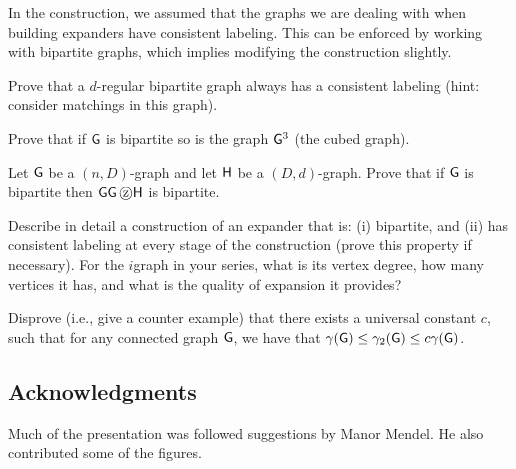 \begin{exercise}
    In the construction, we assumed that the graphs we are dealing
    with when building expanders have consistent labeling.  This can
    be enforced by working with bipartite graphs, which implies
    modifying the construction slightly.
    \begin{compactenumA}
        \item Prove that a $d$-regular bipartite graph always has a
        consistent labeling (hint: consider matchings in this graph).

        \item Prove that if $\mathsf{G}$ is bipartite so is the graph
        $\mathsf{G}^3$ (the cubed graph).

        \item Let $\mathsf{G}$ be a $(n,D)$-graph and let $\mathsf{H}$ be a
        $(D,d)$-graph. Prove that if $\mathsf{G}$ is bipartite then
        $\mathsf{G} \mathsf{G} \, \text{\textcircled{z}} \mathsf{H}$ is bipartite.

        \item Describe in detail a construction of an expander that
        is: (i) bipartite, and (ii) has consistent labeling at every
        stage of the construction (prove this property if necessary).
        For the $i$\th graph in your series, what is its vertex
        degree, how many vertices it has, and what is the quality of
        expansion it provides?
    \end{compactenumA}
\end{exercise}

\begin{exercise}

    Disprove (i.e., give a counter example) that there exists a
    universal constant $c$, such that for any connected graph
    $\mathsf{G}$, we have that $\DialX{\Graph} \leq \BiDialX{\Graph} \leq
    c \DialX{\Graph}$.
\end{exercise}




\subsection*{Acknowledgments}

Much of the presentation was followed suggestions by Manor Mendel. He
also contributed some of the figures.




% 
%

\ChapterEnd{}

 

